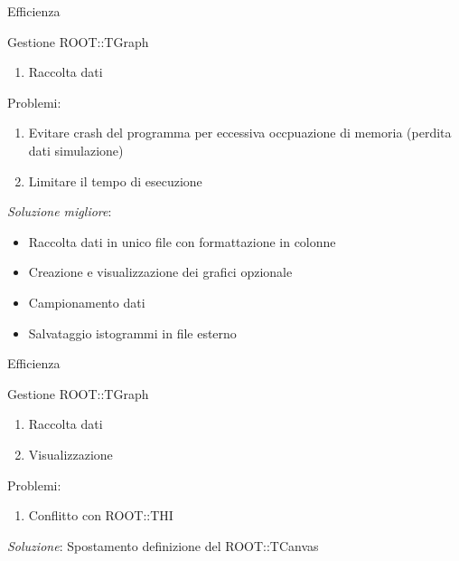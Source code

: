     \begin{frame}{Efficienza}
        \begin{exampleblock}{Gestione ROOT::TGraph}
            \begin{enumerate}
                \item Raccolta dati
            \end{enumerate}
            \vspace{3mm}
            Problemi:
            \begin{enumerate}[i]
                \item Evitare crash del programma per eccessiva occpuazione di memoria (perdita dati simulazione)
                \item Limitare il tempo di esecuzione
            \end{enumerate}
            \vspace{3mm}
            \textit{Soluzione migliore}:
            \begin{itemize}
                \item Raccolta dati in unico file con formattazione in colonne
                \item Creazione e visualizzazione dei grafici opzionale
                \item Campionamento dati
                \item Salvataggio istogrammi in file esterno
            \end{itemize}
        \end{exampleblock}
    \end{frame}

    \begin{frame}{Efficienza}
        \begin{exampleblock}{Gestione ROOT::TGraph}
            \begin{enumerate}
                \item Raccolta dati
                \item Visualizzazione
            \end{enumerate}
            \vspace{3mm}
            Problemi:
            \begin{enumerate}[i]
                \item Conflitto con ROOT::THI
            \end{enumerate}
            \vspace{3mm}
            \textit{Soluzione}: Spostamento definizione del ROOT::TCanvas\\
            
        \end{exampleblock}
    \end{frame}

